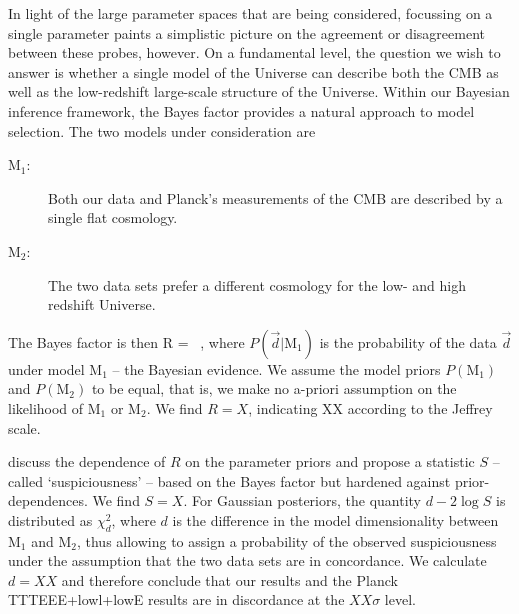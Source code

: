 In light of the large parameter spaces that are being considered, focussing on a single parameter paints a simplistic picture on the agreement or disagreement between these probes, however. 
On a fundamental level, the question we wish to answer is whether a single model of the Universe can describe both the CMB as well as the low-redshift large-scale structure of the Universe.
Within our Bayesian inference framework, the Bayes factor provides a natural approach to model selection. 
The two models under consideration are 
\begin{description}
	\item[$\mathrm{M}_1$:] Both our \tttp data and Planck's measurements of the CMB are described by a single flat \LCDM cosmology.
	\item[$\mathrm{M}_2$:] The two data sets prefer a different cosmology for the low- and high redshift Universe.
\end{description}
The Bayes factor is then
\be
	R =  \ ,
\ee
where $P(\vec d | \mathrm{M}_1)$ is the probability of the data $\vec d$ under model $\mathrm{M}_1$ -- the Bayesian evidence. 
We assume the model priors $P(\mathrm{M}_1)$ and $P(\mathrm{M}_2)$ to be equal, that is, we make no a-priori assumption on the likelihood of $\mathrm{M}_1$ or $\mathrm{M}_2$. 
We find $R=X$, indicating XX according to the Jeffrey scale. 

\citet{Handley2019} discuss the dependence of $R$ on the parameter priors and propose a statistic $S$ -- called `suspiciousness' -- based on the Bayes factor but hardened against prior-dependences. 
We find $S=X$. 
For Gaussian posteriors, the quantity $d-2\log S$ is distributed as $\chi^2_{d}$, where $d$ is the difference in the model dimensionality between $\mathrm{M}_1$ and $\mathrm{M}_2$, thus allowing to assign a probability of the observed suspiciousness under the assumption that the two data sets are in concordance. 
 We calculate $d=XX$ and therefore conclude that our \tttp results and the Planck TTTEEE+lowl+lowE results are in discordance at the $XX\sigma$ level.


